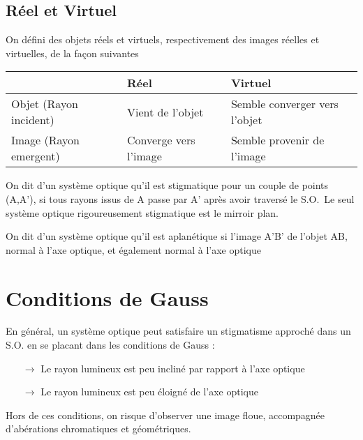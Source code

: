 \subsection{Réel et Virtuel}
On défini des objets réels et virtuels, respectivement des images réelles et virtuelles, de la façon suivantes
\begin{center}
\begin{tabular}{|l|l|l|}
\hline
 & Réel & Virtuel \\\hline
Objet (Rayon incident) & Vient de l'objet & Semble converger vers l'objet \\\hline
Image (Rayon emergent)& Converge vers l'image & Semble provenir de l'image \\\hline
\end{tabular}
\end{center}
\begin{de}
On dit d'un système optique qu'il est stigmatique pour un couple de points (A,A'), si tous rayons issus de A passe par A' après avoir traversé le S.O.\
Le seul système optique rigoureusement stigmatique est le mirroir plan.
\end{de} 
\begin{de}
On dit d'un système optique qu'il est aplanétique si l'image A'B' de l'objet AB, normal à l'axe optique, et également normal à l'axe optique
\end{de} 
\section{Conditions de Gauss}
En général, un système optique peut satisfaire un stigmatisme approché dans un S.O. en se placant dans les conditions de Gauss :
\begin{itemize}
 \item[$\rightarrow$] Le rayon lumineux est peu incliné par rapport à l'axe optique
 \item[$\rightarrow$] Le rayon lumineux est peu éloigné de l'axe optique
\end{itemize}
Hors de ces conditions, on risque d'observer une image floue, accompagnée d'abérations chromatiques et géométriques.
